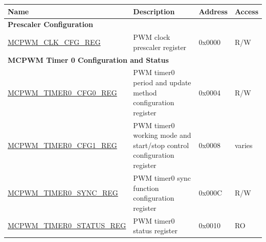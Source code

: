 
\begin{longtable}{ | p{6cm} | p{7.2cm} | p{1.3cm} | p{1cm} | }
\hline\rowcolor{lightgray}
Name & Description &  Address & Access \\ \hline
\endhead
\multicolumn{4}{|l|}{\textbf{Prescaler Configuration}} \\ \hline
\hyperref[regdesc:MCPWMCLKCFGREG]{MCPWM\_CLK\_CFG\_REG} & PWM clock prescaler register & 0x0000 & R/W \\ \hline
\multicolumn{4}{|l|}{\textbf{MCPWM Timer 0 Configuration and Status}} \\ \hline
\hyperref[regdesc:MCPWMTIMER0CFG0REG]{MCPWM\_TIMER0\_CFG0\_REG} & PWM timer0 period and update method configuration register & 0x0004 & R/W \\ \hline
\hyperref[regdesc:MCPWMTIMER0CFG1REG]{MCPWM\_TIMER0\_CFG1\_REG} & PWM timer0 working mode and start/stop control configuration register & 0x0008 & varies \\ \hline
\hyperref[regdesc:MCPWMTIMER0SYNCREG]{MCPWM\_TIMER0\_SYNC\_REG} & PWM timer0 sync function configuration register & 0x000C & R/W \\ \hline
\hyperref[regdesc:MCPWMTIMER0STATUSREG]{MCPWM\_TIMER0\_STATUS\_REG} & PWM timer0 status register & 0x0010 & RO \\ \hline


\end{longtable}
